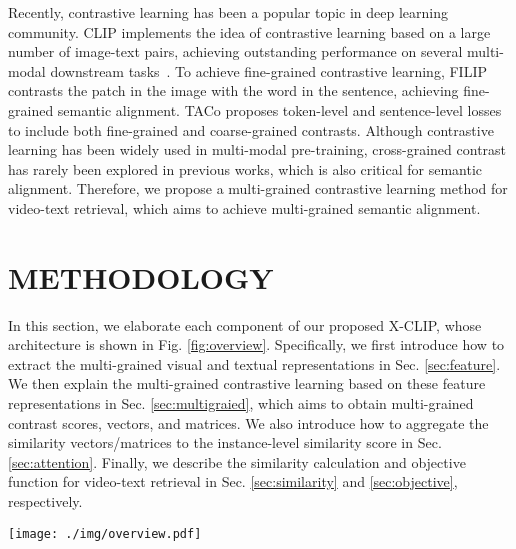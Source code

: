 \documentclass[sigconf]{acmart}
\begin{document}
Recently, contrastive learning \cite{chen2020simple,he2020momentum,chen2020improved,chen2021empirical} has been a popular topic in deep learning community. CLIP \cite{radford2021learning} implements the idea of contrastive learning based on a large number of image-text pairs, achieving outstanding performance on several multi-modal downstream tasks~\citep{zhang2021rstnet,ji2022knowing,ma2022knowing,zhu2022seqtr,ji2021improving,he2022pixelfolder}. To achieve fine-grained contrastive learning, FILIP \cite{yao2021filip} contrasts the patch in the image with the word in the sentence, achieving fine-grained semantic alignment. TACo \cite{yang2021taco} proposes token-level and sentence-level losses to include both fine-grained and coarse-grained contrasts. Although contrastive learning has been widely used in multi-modal pre-training, cross-grained contrast has rarely been explored in previous works, which is also critical for semantic alignment. Therefore, we propose a multi-grained contrastive learning method for video-text retrieval, which aims to achieve multi-grained semantic alignment.

\section{METHODOLOGY}

In this section, we elaborate each component of our proposed X-CLIP, whose architecture is shown in Fig. \ref{fig:overview}. Specifically, we first introduce how to extract the multi-grained visual and textual representations in Sec. \ref{sec:feature}. We then explain the multi-grained contrastive learning based on these feature representations in Sec. \ref{sec:multigraied}, which aims to obtain multi-grained contrast scores, vectors, and matrices. We also introduce how to aggregate the similarity vectors/matrices to the instance-level similarity score in Sec. \ref{sec:attention}. Finally, we describe the similarity calculation and objective function for video-text retrieval in Sec. \ref{sec:similarity} and \ref{sec:objective}, respectively.

\begin{figure*}
\centering 
  \texttt{[image: ./img/overview.pdf]}
  \vspace{-0.3cm}
  \caption{Illustration of the proposed \emph{X-CLIP} model. The input sentences are processed by the text encoder to generate coarse-grained and fine-grained textual representations. The input video is sampled into ordinal frames and these frames are fed into the frame encoder to generate frame-level representations. The frame-level representations are then fed into the temporal encoder to capture the temporal relationships. The outputs of the temporal encoder are fine-grained visual representations, and the coarse-grained visual representation is obtained by averaging all these fine-grained features. Based on these representations, we calculate the video-sentence, video-word, sentence-frame, and frame-word similarity score.}
  \vspace{-0.2cm}
  \label{fig:overview}
\end{figure*}
\end{document}

